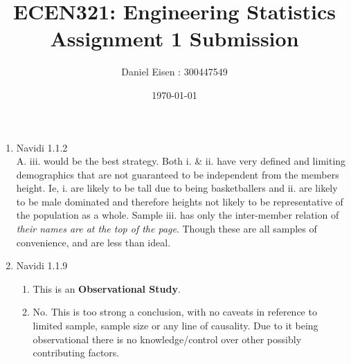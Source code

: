 \documentclass[11pt]{article}
\title{ECEN321: Engineering Statistics \\ Assignment 1 Submission}
\author{Daniel Eisen : 300447549}
\date{\today}
\begin{document}
\maketitle
\begin{enumerate}
\section*{Sampling}
        \item Navidi 1.1.2 \\ 
        A. iii. would be the best strategy. Both i. \& ii. have very defined and limiting demographics that are not guaranteed to be independent from the members height. Ie, i. are likely to be tall due to being basketballers and ii. are likely to be male dominated and therefore heights not likely to be representative of the population as a whole.
        Sample iii. has only the inter-member relation of \textit{their names are at the top of the page}. Though these are all samples of convenience, and are less than ideal.

        \item Navidi 1.1.9
        \begin{enumerate}
                \item This is an \textbf{Observational Study}.
                \item No. This is too strong a conclusion, with no caveats in reference to limited sample, sample size or any line of causality. Due to it being observational there is no knowledge/control over other possibly contributing factors.
        \end{enumerate}


\end{enumerate}
\end{document}
